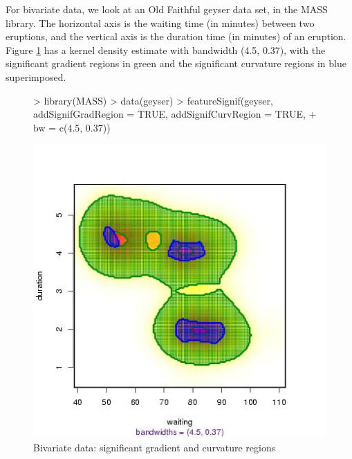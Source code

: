 \documentclass[a4paper]{article}
\begin{document}
\clearpage 
For bivariate data, we look at an Old Faithful geyser data set,
in the MASS library. The
horizontal axis is the waiting time (in minutes) between two eruptions, and
the vertical axis is the duration time (in minutes) of an eruption.
Figure \ref{fig:fs4} has a kernel density estimate with
bandwidth (4.5, 0.37), 
with the significant gradient regions in green
and the 
significant curvature regions in blue superimposed.
\begin{figure}[!ht]
\begin{center}
\begin{Schunk}
\begin{Sinput}
> library(MASS)
> data(geyser)
> featureSignif(geyser, addSignifGradRegion = TRUE, addSignifCurvRegion = TRUE, 
+     bw = c(4.5, 0.37))
\end{Sinput}
\end{Schunk}
\includegraphics{feature-003}
\caption{Bivariate data: significant gradient and curvature regions}
\label{fig:fs4}
\end{center}
\end{figure}
\end{document}

